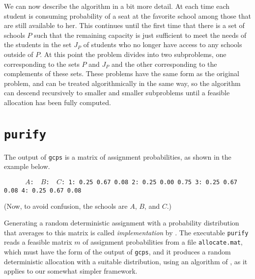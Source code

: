 \documentclass[12pt]{article}
\theoremstyle{definition}
\begin{document}
We can now describe the algorithm in a bit more detail.  At each time
each student is consuming probability of a seat at the favorite school
among those that are still available to her.  This continues until the
first time that there is a set of schools $P$ such that the remaining
capacity is just sufficient to meet the needs of the students in the
set $J_P$ of students who no longer have access to any schools outside
of $P$.  At this point the problem divides into two subproblems, one
corresponding to the sets $P$ and $J_P$ and the other corresponding to
the complements of these sets.  These problems have the same form as
the original problem, and can be treated algorithmically in the same
way, so the algorithm can descend recursively to smaller and smaller
subproblems until a feasible allocation has been fully computed.


\section{\texttt{purify}} \label{sec:Implementation}

The output of \texttt{gcps} is a matrix of assignment probabilities, as shown in the example below.

\begin{obeylines}\texttt{
\ \ \ \ \ $A$:    \     $B$:  \      $C$:
1:      0.25     0.67     0.08
2:      0.25     0.00     0.75
3:      0.25     0.67     0.08
4:      0.25     0.67     0.08
}
\end{obeylines} \noindent
(Now, to avoid confusion, the schools are $A$, $B$, and
$C$.)

\medskip
Generating a random deterministic assignment with a probability
distribution that averages to this matrix is called
\emph{implementation} by \cite{bckm13aer}.  The executable
\texttt{purify} reads a feasible matrix $m$ of assignment
probabilities from a file \texttt{allocate.mat}, which must have the
form of the output of \texttt{gcps}, and it produces a random
deterministic allocation with a suitable distribution, using an
algorithm of \cite{bckm13aer}, as it applies to our somewhat simpler
framework.
\end{document}
